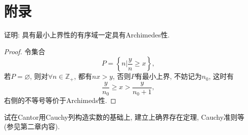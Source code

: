 \section{附录}
\begin{quiza}
\woe 证明: 具有最小上界性的有序域一定具有Archimedes性.
\begin{proof}
令集合\[P=\left\lbrace n\big|\frac{y}{n}\geqslant x \right\rbrace,\]若\(P=\varnothing\), 则对\(\forall n\in\mathbb{Z}_+\), 都有\(nx>y\), 否则\(P\)有最小上界, 不妨记为\(n_0\), 这时有\[\frac{y}{n_0}\geqslant x>\frac{y}{n_0+1},\]右侧的不等号等价于Archimeds性.
\end{proof}
\end{quiza}
\begin{quizb}
\woe  试在Cantor用Cauchy列构造实数的基础上, 建立上确界存在定理, Cauchy准则等(参见第二章内容).
\end{quizb}